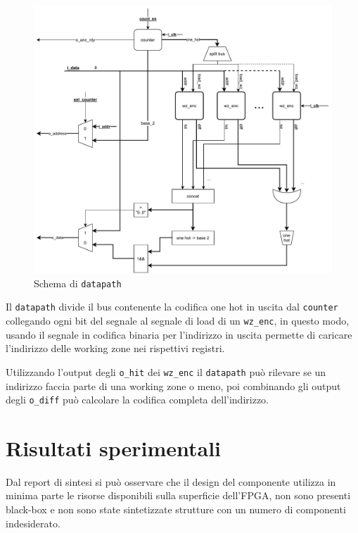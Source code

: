 \documentclass[a4paper]{article}
\begin{document}
\begin{figure}[H]
  \centering
  \includegraphics[width=\linewidth]{schema-datapath.pdf}
  \caption{Schema di \texttt{datapath}}
  \label{fig:datapath}
\end{figure}

Il \texttt{datapath} divide il bus contenente la codifica one hot in uscita dal \texttt{counter} collegando ogni bit del segnale al segnale di load di un \texttt{wz\_enc}, in questo modo, usando il segnale in codifica binaria per l'indirizzo in uscita permette di caricare l'indirizzo delle working zone nei rispettivi registri. 

Utilizzando l'output degli \texttt{o\_hit} dei \texttt{wz\_enc} il \texttt{datapath} può rilevare se un indirizzo faccia parte di una working zone o meno, poi combinando gli output degli \texttt{o\_diff} può calcolare la codifica completa dell'indirizzo.


\section{Risultati sperimentali}

Dal report di sintesi si può osservare che il design del componente utilizza in minima parte le risorse disponibili sulla superficie dell'FPGA, non sono presenti black-box e non sono state sintetizzate strutture con un numero di componenti indesiderato.
\end{document}
